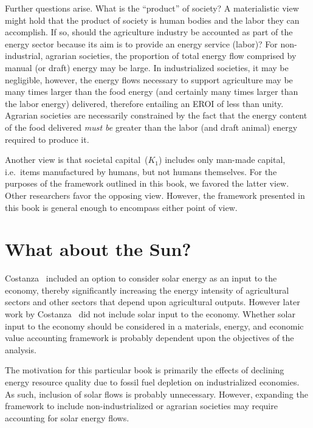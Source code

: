 Further questions arise. 
What is the ``product'' of society? 
A materialistic view might hold that the product of
society is human bodies and the labor they can accomplish. 
If so, 
should the agriculture industry 
be accounted as part of the energy sector 
because its aim is to provide 
an energy service (labor)? 
For non-industrial, agrarian societies, 
the proportion of total energy flow 
comprised by manual (or draft) energy 
may be large. 
In industrialized societies, 
it may be negligible, 
however, 
the energy flows necessary to support agriculture
may be many times larger than the food energy
(and certainly many times larger 
than the labor energy) 
delivered, therefore entailing an EROI of less than unity. 
Agrarian societies are necessarily constrained 
by the fact that the energy content of the food delivered 
\emph{must be} greater than the labor (and draft animal) 
energy required to produce it.

Another view is that societal capital~($K_{1}$) 
includes only man-made capital, 
i.e.\ items manufactured by humans,
but not humans themselves. 
For the purposes of the framework outlined in this book, 
we favored the latter view.
Other researchers favor the opposing view.\cite{Giampietro2013}
However,
the framework presented in this book is general enough to encompass either point of view.


\section{What about the Sun?}
\label{sec:emergy}

Costanza~\cite{Costanza:1978vd} included an option to consider 
solar energy as an input to the economy, 
thereby significantly increasing the energy intensity 
of agricultural sectors and other sectors 
that depend upon agricultural outputs. 
However later work by Costanza~\cite{Costanza:1984tq,Costanza:1980ww} 
did not include solar input to the economy.
Whether solar input to the economy 
should be considered in a materials, energy, and economic value 
accounting framework is probably dependent upon 
the objectives of the analysis. 

The motivation for this particular book is primarily 
the effects of declining energy resource quality
due to fossil fuel depletion on industrialized economies. 
As such, inclusion of solar flows is probably unnecessary. 
However, expanding the framework to include non-industrialized 
or agrarian societies may require accounting for solar energy flows. 

